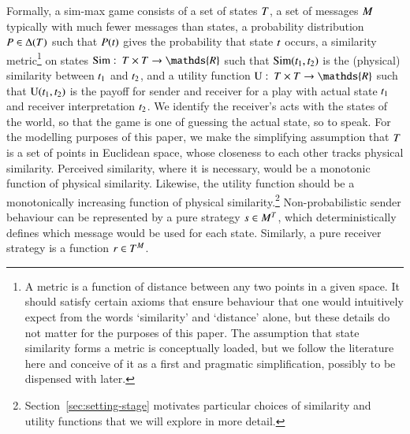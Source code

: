 \documentclass[12pt,english]{article}
\newcommand{\similarity}{\ensuremath{\mathrm{Sim}}} %
\renewcommand{\Pr}{\ensuremath{P}}
\numberwithin{equation}{section}
\begin{document}
Formally, a sim-max game consists of a set of states $T$, a set of messages $M$
typically with much fewer messages than states, a probability distribution
$\Pr \in \Delta(\States)$ such that $\Pr(\state)$ gives the probability that state $t$
occurs, a similarity metric\footnote{A metric is a function of distance between any two points
  in a given space. It should satisfy certain axioms that ensure behaviour that one would
  intuitively expect from the words `similarity' and `distance' alone, but these details do
  not matter for the purposes of this paper. The assumption that state similarity forms a
  metric is conceptually loaded, but we follow the literature here and conceive of it as a
  first and pragmatic simplification, possibly to be dispensed with later.}
on states $\similarity \mycolon \States \times \States \rightarrow \mathds{R}$ such that
$\similarity(\mystate{1}, \mystate{2})$ is the (physical) similarity between $t_{\mathrm{1}}$ and
$t_{\mathrm{2}}$, and a utility function
$\Utils \mycolon \States \times \States \rightarrow \mathds{R}$ such that
$\mathrm{U}(t_{\mathrm{1}}, t_{\mathrm{2}})$ is the payoff for sender and receiver for a play with actual
state $t_{\mathrm{1}}$ and receiver interpretation $t_{\mathrm{2}}$. We identify the receiver's acts
with the states of the world, so that the game is one of guessing the actual state, so to
speak. For the modelling purposes of this paper, we make the simplifying assumption that
$T$ is a set of points in Euclidean space, whose closeness to each other tracks physical
similarity. Perceived similarity, where it is necessary, would be a monotonic function of
physical similarity. Likewise, the utility function should be a monotonically increasing
function of physical similarity.\footnote{Section~\ref{sec:setting-stage} motivates particular
  choices of similarity and utility functions that we will explore in more detail.}
Non-probabilistic sender behaviour can be represented by a pure strategy
$s \in M^T$, which deterministically defines which message would be used for
each state. Similarly, a pure receiver strategy is a function $r \in T^M$.
\end{document}

